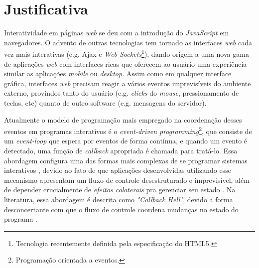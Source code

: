 \section{Justificativa}\label{ljustificativa}

Interatividade em páginas \textit{web} se deu com a
introdução do \textit{JavaScript} em navegadores.
O advento de outras tecnologias tem tornado as interfaces
\textit{web} cada vez mais interativas
(e.g. Ajax e \textit{Web Sockets}\footnote{
  Tecnologia recentemente definida pela especificação do HTML5.
}),
dando origem a uma nova gama de aplicações \textit{web}
com interfaces ricas que oferecem ao usuário uma experiência
similar as aplicações \textit{mobile} ou \textit{desktop}.
Assim como em qualquer interface gráfica, interfaces \textit{web}
precisam reagir a vários eventos imprevisíveis do ambiente
externo, provindos tanto do usuário (e.g. \textit{clicks}
do \textit{mouse}, pressionamento de teclas, etc)
quanto de outro software (e.g. mensagens do servidor).

Atualmente o modelo de programação mais empregado na
coordenação desses eventos em programas interativos é o
\textit{event-driven programming}\footnote{
  Programação orientada a eventos.
},
que consiste de um \textit{event-loop} que espera por
eventos de forma contínua, e quando um evento é detectado,
uma função de \textit{callback} apropriada é chamada para
tratá-lo.
Essa abordagem configura uma das formas mais complexas de se
programar sistemas interativos \cite{
  edwards2009coherent,
  maier2010deprecating,
  reppy1992higher},
devido ao fato de que aplicações desenvolvidas utilizando
esse mecanismo apresentam um fluxo de controle desestruturado
e imprevisível, além de depender crucialmente de
\textit{efeitos colaterais\footnotemark} pra
gerenciar seu estado \cite{
  meyerovich2009flapjax,
  muller2015interactive,
  muller2015practical}.
Na literatura, essa abordagem é descrita como \textit{"Callback Hell"},
devido a forma desconcertante com que o fluxo de controle coordena
mudanças no estado do programa \cite[p.~2]{edwards2009coherent}.

